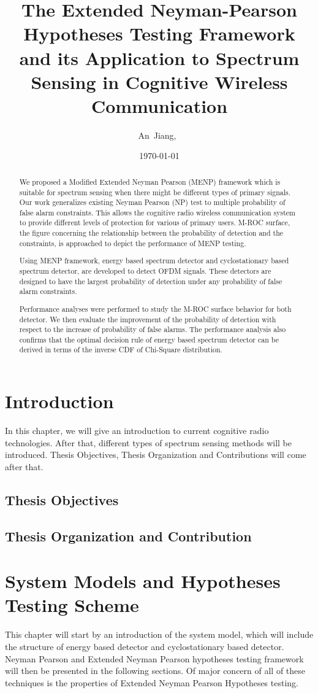 \documentclass{article}
\author{An~Jiang,~
    }
\title{The Extended Neyman-Pearson Hypotheses Testing Framework and its Application to Spectrum Sensing in Cognitive Wireless Communication}
\date{\today}
\begin{document}
\begin{spacing}{2.0}
\maketitle
\begin{abstract}
We proposed a Modified Extended Neyman Pearson (MENP) framework which is suitable for spectrum sensing when there might be different types of primary signals. Our work generalizes existing Neyman Pearson (NP) test to multiple probability of false alarm constraints. This allows the cognitive radio wireless communication system to provide different levels of protection for various of primary users.  
M-ROC surface, the figure concerning the relationship between the probability of detection and the constraints, is approached to depict the performance of MENP testing.   

Using MENP framework, energy based spectrum detector and cyclostationary based spectrum detector, are developed to detect OFDM signals. These detectors are designed to have the largest probability of detection under any probability of false alarm constraints.  

Performance analyses were performed to study the M-ROC surface behavior for both detector. We then evaluate the improvement of the probability of detection with respect to the increase of probability of false alarms.  
The performance analysis also confirms that the optimal decision rule of energy based spectrum detector can be derived in terms of the inverse CDF of Chi-Square distribution.  
\end{abstract}

\section{Introduction}
In this chapter, we will give an introduction to current cognitive radio technologies. After that, different types of spectrum sensing methods will be introduced. Thesis Objectives, Thesis Organization and Contributions will come after that.
\subsection{Thesis Objectives}
\subsection{Thesis Organization and Contribution}
\newpage
\section{System Models and Hypotheses Testing Scheme}
This chapter will start by an introduction of the system model, which will include the structure of energy based detector and cyclostationary based detector. Neyman Pearson and Extended Neyman Pearson hypotheses testing framework will then be presented in the following sections. Of major concern of all of these techniques is the properties of Extended Neyman Pearson Hypotheses testing. 

\end{spacing}
\end{document}
